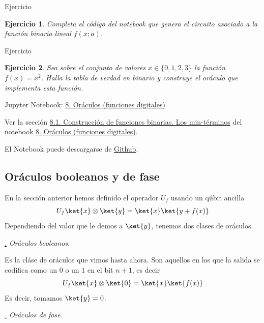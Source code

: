 \documentclass[a4paper,11pt]{book} %
\newtheorem{ejercicio_contador}{Ejercicio}
\newcommand{\Ejercicio}[1]{
		\begin{mybox_gray}{Ejercicio} 
			\begin{ejercicio_contador}
				 #1 
			\end{ejercicio_contador} 
		\end{mybox_gray}
	}
\numberwithin{equation}{chapter}
\def\subsubiContadorIt{\par\addtocounter{subsubsection}{1}\underline{\it\thesubsubsection.}\hskip0.5cm \setcounter{subsubsubsectionIt}{0}}
\newcommand{\SubsubiIt}[1]{
		\subsubiContadorIt \textit{#1}
	}
\newcounter{subsubsubsectionIt}[subsubsection]
\begin{document}
	\Ejercicio{
	Completa el código del notebook que genera el circuito asociado a la función binaria lineal $f(x;a)$.
	}
	
	\Ejercicio{
	Sea sobre el conjunto de valores $x\in \{0,1,2,3\}$ la función $f(x) = x^2$. Halla la tabla de verdad 
	en binario y construye el oráculo que implementa esta función.
	}


	\begin{mybox_orange}{Jupyter Notebook: \href{https://www.scbi.uma.es/web/wp-content/uploads/Jupyterbook/CICC_UMA/Notebooks/html/docs/Part_01/Chapter_08-Estado_inicial_y_oraculo_myst.html}{8. Oráculos (funciones digitales)}}
	
	Ver la sección \href{https://www.scbi.uma.es/web/wp-content/uploads/Jupyterbook/CICC_UMA/Notebooks/html/docs/Part_01/Chapter_08-Estado_inicial_y_oraculo_myst.html#sec-notebooks-oraculos-1}{8.1. Construcción de funciones binarias. Los min-términos} del notebook \href{https://www.scbi.uma.es/web/wp-content/uploads/Jupyterbook/CICC_UMA/Notebooks/html/docs/Part_01/Chapter_08-Estado_inicial_y_oraculo_myst.html}{8. Oráculos (funciones digitales)}.
	
	El Notebook puede descargarse de \href{https://github.com/davidcb98/CICC_UMA/blob/master/Notebooks/Part_01/Chapter_08-Estado_inicial_y_oraculo.ipynb}{Github}.	
	\end{mybox_orange}
	
    	
    	
    	\subsection{Oráculos booleanos y de fase}

En la sección anterior hemos definido el operador  $U_f$ usando un qúbit ancilla
\begin{equation}
U_f \ket{x}\otimes\ket{y} = \ket{x}\ket{y + f(x)}
\end{equation}
Dependiendo del valor que le demos a $\ket{y}$, tenemos dos clases de oráculos. 


			\SubsubiIt{Oráculos booleanos.}

Es la cláse de oráculos que vimos hasta ahora. Son aquellos en los que la salida se codifica como un $0$ o un $1$ en el bit $n+1$, es decir
\begin{equation}
U_f \ket{x}\otimes\ket{0} = \ket{x}\ket{f(x)}
\end{equation}
Es decir, tomamos $\ket{y} = 0$.

			\SubsubiIt{Oráculos de fase.} 
\end{document}
